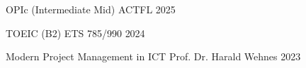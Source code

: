 
\begin{cvhonors}

  \cvhonor
  {OPIc (Intermediate Mid)} %
  {ACTFL} %
  {} %
  {2025} %

  \cvhonor
  {TOEIC (B2)} %
  {ETS} %
  {785/990} %
  {2024} %

  \cvhonor
  {Modern Project Management in ICT} %
  {Prof. Dr. Harald Wehnes} %
  {} %
  {2023} %

\end{cvhonors}
